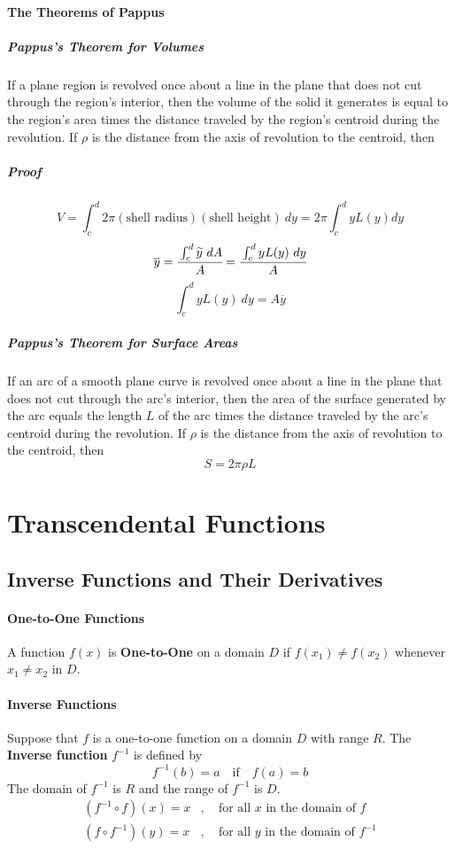 \documentclass{article}
\begin{document}
            \paragraph{The Theorems of Pappus}
                \subparagraph{Pappus's Theorem for Volumes}If  a  plane  region  is  revolved  once about a line in the plane that does not cut through the region’s interior, then the volume of the solid it generates is equal to the region’s area times the distance traveled by the region’s centroid during the revolution. If $\rho$ is the distance from the axis of revolution to the centroid, then
                \subparagraph{Proof} 
                \[V=\int_c^d 2\pi (\text{shell radius})(\text{shell height})\ dy=2\pi \int_c^d yL(y) dy\]
                \[\overline{y}=\cfrac{\int_c^d \widetilde{y}\ dA}{A}=\cfrac{\int_c^d yL(y)\ dy}{A}\]
                \[\int_{c}^{d} yL(y)\ dy =A \overline{y}\]
                \subparagraph{Pappus's Theorem for Surface Areas}  If  an  arc  of  a  smooth  plane curve is revolved once about a line in the plane that does not cut through the  arc’s  interior,  then  the  area  of  the  surface  generated  by  the  arc  equals  the  length $L$  of  the  arc  times  the  distance  traveled  by  the  arc’s  centroid  during  the  revolution. If $\rho$ is the distance from the axis of revolution to the centroid, then
                \[S=2\pi \rho L\]
    
    \newpage
    \section{Transcendental Functions} 
        \subsection{Inverse Functions and Their Derivatives}
            \paragraph{One-to-One Functions}
            A function $f(x)$ is \textbf{One-to-One} on a domain $D$ if $f(x_1)\ne f(x_2)$ whenever $x_1\ne x_2$ in $D$.
            \paragraph{Inverse Functions}
            Suppose that $f$ is a one-to-one function on a domain $D$ with range $R$. The \textbf{Inverse function} $f^{-1}$ is defined by
            \[f^{-1}(b)=a\quad \text{if}\quad f(a)=b\] 
            The domain of $f^{-1}$ is $R$ and the range of $f^{-1}$ is $D$.
            \begin{equation}
                \begin{aligned}
                    (f^{-1}\circ f)(x)=x&,\quad \text{for all $x$ in the domain of $f$}\\
                    (f\circ f^{-1})(y)=x&,\quad \text{for all $y$ in the domain of $f^{-1}$}\\
                \end{aligned}
            \end{equation}
\end{document}
